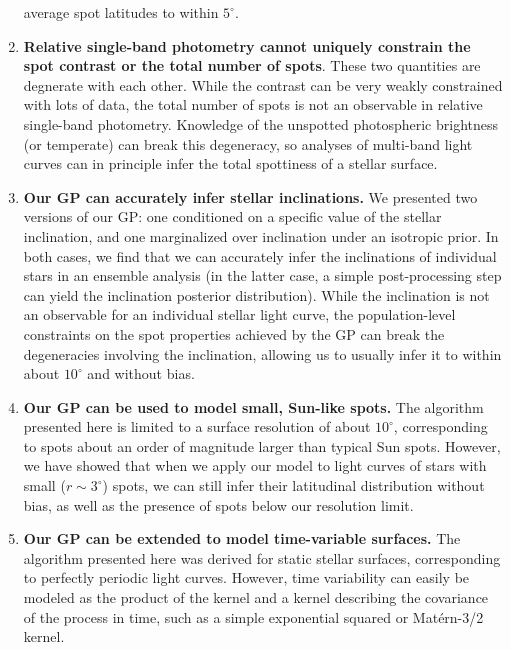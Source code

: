 \documentclass[modern]{aastex62}
\begin{document}
\begin{enumerate}
          average spot latitudes to within $5^\circ$.
    \item \textbf{Relative single-band photometry cannot uniquely constrain
              the spot contrast or the total number of spots}. These two quantities
          are degnerate with each other. While the contrast can be very weakly
          constrained with lots of data, the total number of spots is not
          an observable in relative single-band photometry. Knowledge of the
          unspotted photospheric brightness (or temperate) can break this
          degeneracy, so analyses of multi-band light curves can in principle
          infer the total spottiness of a stellar surface.
    \item \textbf{Our GP can accurately infer stellar inclinations.} We presented
          two versions of our GP: one conditioned on a specific value of the stellar
          inclination, and one marginalized over inclination under an isotropic
          prior. In both cases, we find that we can accurately infer the inclinations
          of individual stars in an ensemble analysis (in the latter case, a
          simple post-processing step can yield the inclination posterior distribution).
          While the inclination is not an observable for an individual stellar light
          curve, the population-level constraints on the spot properties achieved
          by the GP can break the degeneracies involving the inclination, allowing
          us to usually infer it to within about $10^\circ$ and without bias.
    \item \textbf{Our GP can be used to model small, Sun-like spots.} The algorithm
          presented here is limited to a surface resolution of about $10^\circ$,
          corresponding to spots about an order of magnitude larger than typical
          Sun spots. However, we have showed that when we apply our model to
          light curves of stars with small ($r \sim 3^\circ$) spots, we can
          still infer their latitudinal distribution without bias, as well as
          the presence of spots below our resolution limit.
    \item \textbf{Our GP can be extended to model time-variable surfaces.} The
          algorithm presented here was derived for static stellar surfaces,
          corresponding to perfectly periodic light curves. However, time
          variability can easily be modeled as the product of the \starryprocess
          kernel and a kernel describing the covariance of the process in
          time, such as a simple exponential squared or Mat\'ern-3/2 kernel.

\end{enumerate}
\end{document}
